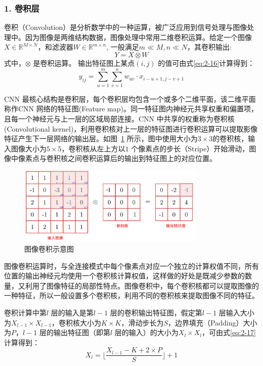 \subsubsection*{1. 卷积层}
\label{subsec:chap02-2-1-1}
卷积（Convolution）是分析数学中的一种运算，被广泛应用到信号处理与图像处理中。因为图像是两维结构数据，图像处理中常用二维卷积运算。给定一个图像$X \in \mathbb{R}^{M \times N}$，和滤波器$W \in \mathbb{R}^{m \times n}$, 一般满足$m \ll M, n \ll N$，其卷积输出:
\begin{equation}
  \label{eq:2-15}
  Y = X \otimes W
\end{equation}
式中，$\otimes$ 是卷积运算。 输出特征图上某点$(i,j)$ 的值可由式\ref{eq:2-16}计算得到：
\begin{equation}
  \label{eq:2-16}
  y_{ij} = \sum_{u=1}^m\sum_{v=1}^n w_{uv}\cdot x_{i-u+1,j-v+1} 
\end{equation}

CNN 最核心结构是卷积层，每个卷积层均包含一个或多个二维平面，该二维平面称作CNN 网络的特征图(Feature map)。同一特征图内神经元共享权重和偏置项，且每一个神经元与上一层的区域局部连接。CNN 中共享的权重称为卷积核(Convolutional kernel)，利用卷积核对上一层的特征图进行卷积运算可以提取影像特征产生下一层网络的输出层。如图~\ref{fig:conv_op} 所示，图中使用大小为$3\times3$的卷积核，输入图像大小为$5\times5$，卷积核从左上方以$1$ 个像素点的步长（Stripe）开始滑动，图像中像素点与卷积核之间卷积运算后的输出到特征图上的对应位置。

\begin{figure}[htbp]
  \centering
  \includegraphics[width=0.8\textwidth]{figures/conv_op}
  \caption{图像卷积示意图}\label{fig:conv_op}
\end{figure}

图像卷积运算时，与全连接模式中每个像素点对应一个独立的计算权值不同，所有位置的输出神经元均使用一个卷积核计算权值，这样做的好处是既减少参数的数量，又利用了图像特征的局部性特点。图像卷积中，每个卷积核都可以提取图像的一种特征，所以一般设置多个卷积核，利用不同的卷积核来提取图像不同的特征。

卷积计算中第$l$ 层的输入是第$l-1$ 层的卷积输出特征图，假定第$l-1$ 层输入大小为$X_{l-1} \times X_{l-1}$，卷积核大小为$K \times K$，滑动步长为$S$，边界填充（Padding）大小为$P$，$l-1$ 层的输出特征图（即第$l$ 层的输入）的大小为$X_l \times X_l$，可由式\ref{eq:2-17} 计算得到：
\begin{equation}
  \label{eq:2-17}
  X_l = \lfloor \frac{X_{l-1} - K + 2 \times P}{S} \rfloor + 1
\end{equation}

